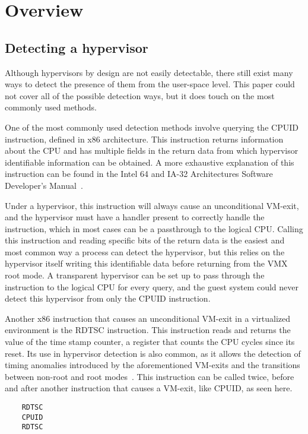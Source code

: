 \section{Overview}\label{s:overview}

\subsection{Detecting a hypervisor}\label{HV_detection}

Although hypervisors by design are not easily detectable, there still exist many ways to detect the presence of them from the user-space level. 
This paper could not cover all of the possible detection ways, but it does touch on the most commonly used methods.

One of the most commonly used detection methods involve querying the CPUID instruction, defined in x86 architecture. 
This instruction returns information about the CPU and has multiple fields in the return data from which hypervisor identifiable information can be obtained. 
A more exhaustive explanation of this instruction can be found in the Intel\textsuperscript{\tiny\textregistered} 64 and IA-32 Architectures Software Developer's Manual~\cite[Volume~2A]{Intel-SDM2025}. 

Under a hypervisor, this instruction will always cause an unconditional VM-exit, and the hypervisor must have a handler present to correctly handle the instruction, 
which in most cases can be a passthrough to the logical CPU. Calling this instruction and reading specific bits of the return data is the easiest 
and most common way a process can detect the hypervisor, but this relies on the hypervisor itself writing this identifiable data before returning from the VMX root mode. 
A transparent hypervisor can be set up to pass through the instruction to the logical CPU for every query, and the guest system could never detect this hypervisor from only the CPUID instruction.

Another x86 instruction that causes an unconditional VM-exit in a virtualized environment is the RDTSC instruction. This instruction reads and returns the value of the time stamp counter, 
a register that counts the CPU cycles since its reset. Its use in hypervisor detection is also common, as it allows the detection of timing anomalies introduced by the aforementioned VM-exits 
and the transitions between non-root and root modes~\cite{hyperdbg-transparency}. This instruction can be called twice, before and after another instruction that causes a VM-exit, like CPUID, as seen here.
\begin{verbatim}
    RDTSC
    CPUID
    RDTSC
\end{verbatim}

